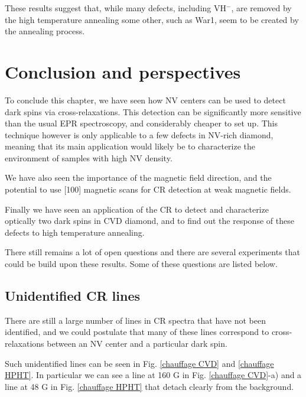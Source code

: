 \documentclass[a4paper, 11pt]{report}
\begin{document}
These results suggest that, while many defects, including VH$^-$, are removed by the high temperature annealing some other, such as War1, seem to be created by the annealing process.

\section{Conclusion and perspectives}

To conclude this chapter, we have seen how NV centers can be used to detect dark spins via cross-relaxations. This detection can be significantly more sensitive than the usual EPR spectroscopy, and considerably cheaper to set up. This technique however is only applicable to a few defects in NV-rich diamond, meaning that its main application would likely be to characterize the environment of samples with high NV density.

We have also seen the importance of the magnetic field direction, and the potential to use [100] magnetic scans for CR detection at weak magnetic fields.

Finally we have seen an application of the CR to detect and characterize optically two dark spins in CVD diamond, and to find out the response of these defects to high temperature annealing.

There still remains a lot of open questions and there are several experiments that could be build upon these results. Some of these questions are listed below.

\subsection{Unidentified CR lines}

There are still a large number of lines in CR spectra that have not been identified, and we could postulate that many of these lines correspond to cross-relaxations between an NV center and a particular dark spin. %

Such unidentified lines can be seen in Fig. \ref{chauffage CVD} and \ref{chauffage HPHT}. In particular we can see a line at 160 G in Fig. \ref{chauffage CVD}-a) and a line at 48 G in Fig. \ref{chauffage HPHT} that detach clearly from the background. 
\end{document}
